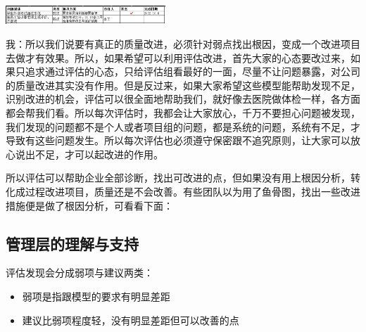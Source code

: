 \includegraphics[width=6cm]{IssuesScreenshot_2022-10-19_205655.jpg}

我：所以我们说要有真正的质量改进，必须针对弱点找出根因，变成一个改进项目去做才有效果。所以，如果希望可以利用评估改进，首先大家的心态要改过来，如果只追求通过评估的心态，只给评估组看最好的一面，尽量不让问题暴露，对公司的质量改进其实没有作用。但是反过来，如果大家希望这些模型能帮助发现不足，识别改进的机会，评估可以很全面地帮助我们，就好像去医院做体检一样，各方面都会帮我们看。所以每次评估时，我都会让大家放心，千万不要担心问题被发现，我们发现的问题都不是个人或者项目组的问题，都是系统的问题，系统有不足，才导致有这些问题发生。所以每次评估也必须遵守保密跟不追究原则，让大家可以放心说出不足，才可以起改进的作用。

所以评估可以帮助企业全部诊断，找出可改进的点，但如果没有用上根因分析，转化成过程改进项目，质量还是不会改善。有些团队以为用了鱼骨图，找出一些改进措施便是做了根因分析，可看看下面：


\hypertarget{ux7ba1ux7406ux5c42ux7684ux7406ux89e3ux4e0eux652fux6301}{%
\subsection{管理层的理解与支持}\label{ux7ba1ux7406ux5c42ux7684ux7406ux89e3ux4e0eux652fux6301}}

评估发现会分成弱项与建议两类：

\begin{itemize}
\tightlist
\item
  弱项是指跟模型的要求有明显差距
\item
  建议比弱项程度轻，没有明显差距但可以改善的点\\
\end{itemize}

